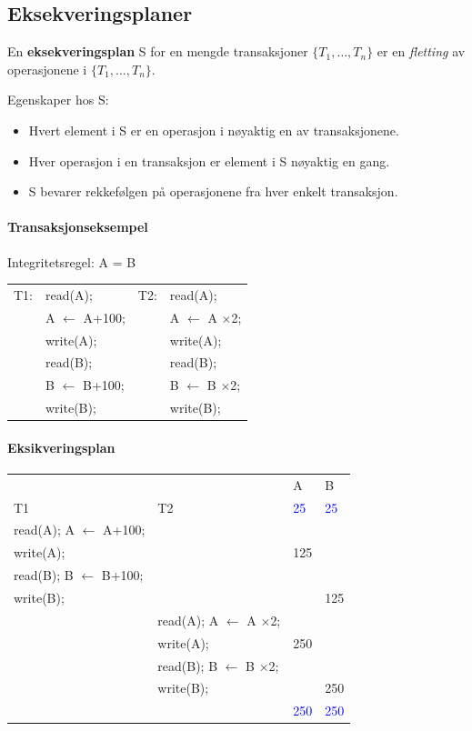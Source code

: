 \documentclass[12pt,a4paper]{article}
\begin{document}
\subsection{Eksekveringsplaner}
En \textbf{eksekveringsplan} S for en mengde transaksjoner $\{T_1, \dots, T_n\}$ er en \textit{fletting} av operasjonene i $\{T_1, \dots, T_n\}$.

Egenskaper hos S:
\begin{itemize}
\item{Hvert element i S er en operasjon i nøyaktig en av transaksjonene.}
\item{Hver operasjon i en transaksjon er element i S nøyaktig en gang.}
\item{S bevarer rekkefølgen på operasjonene fra hver enkelt transaksjon.}
\end{itemize}

\paragraph{Transaksjonseksempel}
Integritetsregel: A = B

\begin{center}
\begin{tabular}{l l l l}
T1: & read(A); & T2: & read(A);\\
& A $\leftarrow$ A+100; &  & A $\leftarrow$ A $\times$2;\\
& write(A); & & write(A);\\
& read(B); & & read(B);\\
& B $\leftarrow$ B+100; && B $\leftarrow$ B $\times$2;\\
& write(B); && write(B);\\
\end{tabular}
\end{center}

\paragraph{Eksikveringsplan}
\begin{center}
\begin{tabular}{l l | l | l}
& & A & B\\
T1 & T2 & \textcolor{blue}{25} & \textcolor{blue}{25}\\
\hline
read(A); A $\leftarrow$ A+100; & & &\\
write(A); & & 125 &\\
read(B); B $\leftarrow$ B+100; & & &\\
write(B); & & & 125\\
& read(A); A $\leftarrow$ A $\times$2; & &\\
& write(A); & 250 &\\
& read(B); B $\leftarrow$ B $\times$2; & &\\
& write(B); & & 250\\
& & \textcolor{blue}{250} & \textcolor{blue}{250}\\
\end{tabular}
\end{center}
\end{document}
